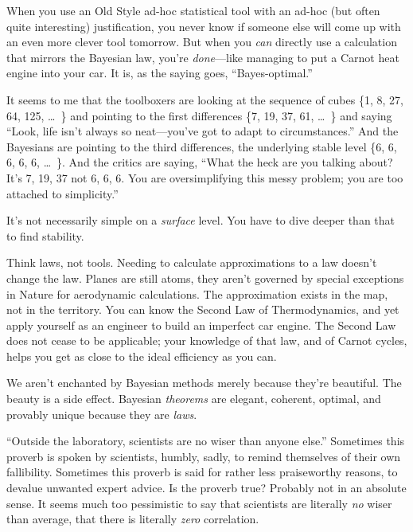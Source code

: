 {
 When you use an Old Style ad-hoc statistical tool with an ad-hoc
(but often quite interesting) justification, you never know if someone
else will come up with an even more clever tool tomorrow. But when you
\textit{can} directly use a calculation that mirrors the Bayesian law,
you're \textit{done}{}---like managing to put a Carnot
heat engine into your car. It is, as the saying goes,
``Bayes-optimal.''}

{
 It seems to me that the toolboxers are looking at the sequence of
cubes \{1, 8, 27, 64, 125,
\ldots~\} and pointing to the first
differences \{7, 19, 37, 61,
\ldots~\} and saying
``Look, life isn't always so
neat---you've got to adapt to
circumstances.'' And the Bayesians are pointing to
the third differences, the underlying stable level
\{6, 6, 6, 6, 6,
\ldots~\}. And the critics are saying,
``What the heck are you talking about?
It's 7, 19, 37 not 6, 6, 6. You are oversimplifying
this messy problem; you are too attached to
simplicity.''}

{
 It's not necessarily simple on a \textit{surface}
level. You have to dive deeper than that to find stability.}

{
 Think laws, not tools. Needing to calculate approximations to a
law doesn't change the law. Planes are still atoms,
they aren't governed by special exceptions in Nature
for aerodynamic calculations. The approximation exists in the map, not
in the territory. You can know the Second Law of Thermodynamics, and
yet apply yourself as an engineer to build an imperfect car engine. The
Second Law does not cease to be applicable; your knowledge of that law,
and of Carnot cycles, helps you get as close to the ideal efficiency as
you can.}

{
 We aren't enchanted by Bayesian methods merely
because they're beautiful. The beauty is a side effect.
Bayesian \textit{theorems} are elegant, coherent, optimal, and provably
unique because they are \textit{laws}.}

\myendsectiontext


\bigskip


{
 ``Outside the laboratory, scientists are no wiser
than anyone else.'' Sometimes this proverb is spoken
by scientists, humbly, sadly, to remind themselves of their own
fallibility. Sometimes this proverb is said for rather less
praiseworthy reasons, to devalue unwanted expert advice. Is the proverb
true? Probably not in an absolute sense. It seems much too pessimistic
to say that scientists are literally \textit{no} wiser than average,
that there is literally \textit{zero} correlation. }

